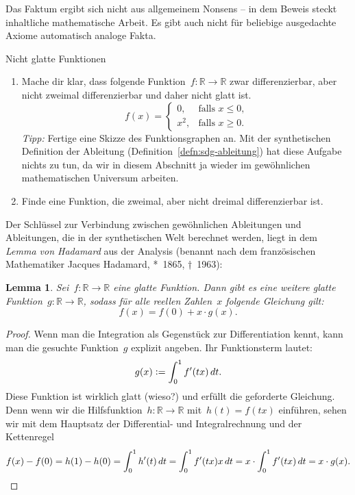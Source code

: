 \documentclass[twoside]{../zirkelblatt}
\newcommand{\RR}{\mathbb{R}}
\newcommand{\defeq}{\vcentcolon=}
\theoremstyle{definition}
\theoremstyle{plain}
\newtheorem{lemma}[defn]{Lemma}
\theoremstyle{remark}
\begin{document}
Das Faktum ergibt sich nicht aus allgemeinem Nonsens -- in dem Beweis steckt
inhaltliche mathematische Arbeit. Es gibt auch nicht für beliebige
ausgedachte Axiome automatisch analoge Fakta.

\begin{aufgabeShaded}{Nicht glatte Funktionen}
\begin{enumerate}
\item Mache dir klar, dass folgende Funktion~$f : \RR \to \RR$ zwar differenzierbar,
aber nicht zweimal differenzierbar und daher nicht glatt ist.
\[ f(x) = \begin{cases}
  0, & \text{falls~$x \leq 0$,} \\
  x^2, & \text{falls~$x \geq 0$.}
\end{cases} \]
\emph{Tipp:} Fertige eine Skizze des Funktionsgraphen an. Mit der synthetischen
Definition der Ableitung (Definition~\ref{defn:sdg-ableitung}) hat diese
Aufgabe nichts zu tun, da wir in diesem Abschnitt ja wieder im gewöhnlichen
mathematischen Universum arbeiten.
\item Finde eine Funktion, die zweimal, aber nicht dreimal differenzierbar ist.
\end{enumerate}
\end{aufgabeShaded}

Der Schlüssel zur Verbindung zwischen gewöhnlichen Ableitungen und Ableitungen, die in der synthetischen
Welt berechnet werden, liegt in dem \emph{Lemma
von Hadamard} aus der Analysis (benannt nach dem französischen Mathematiker
Jacques Hadamard, *~1865, †~1963):

\begin{lemma}Sei~$f : \RR \to \RR$ eine glatte Funktion. Dann gibt es eine
weitere glatte Funktion~$g : \RR \to \RR$, sodass für alle reellen Zahlen~$x$
folgende Gleichung gilt:
\[ f(x) = f(0) + x \cdot g(x). \]
\end{lemma}
\begin{proof}Wenn man die Integration als Gegenstück zur Differentiation kennt,
kann man die gesuchte Funktion~$g$ explizit angeben. Ihr Funktionsterm lautet:
\[ g(x) \defeq \int_0^1 f'(tx) \, dt. \]
Diese Funktion ist wirklich glatt (wieso?) und erfüllt die geforderte
Gleichung. Denn wenn wir die Hilfsfunktion~$h : \RR \to \RR$ mit~$h(t) = f(tx)$
einführen, sehen wir mit dem Hauptsatz der Differential- und Integralrechnung
und der Kettenregel
\[
  f(x) - f(0) = h(1) - h(0) =
  \int_0^1 h'(t) \,dt
  = \int_0^1 f'(tx) x \,dt
  = x \cdot \int_0^1 f'(tx) \,dt
  = x \cdot g(x). \qedhere
\]
\end{proof}
\end{document}
